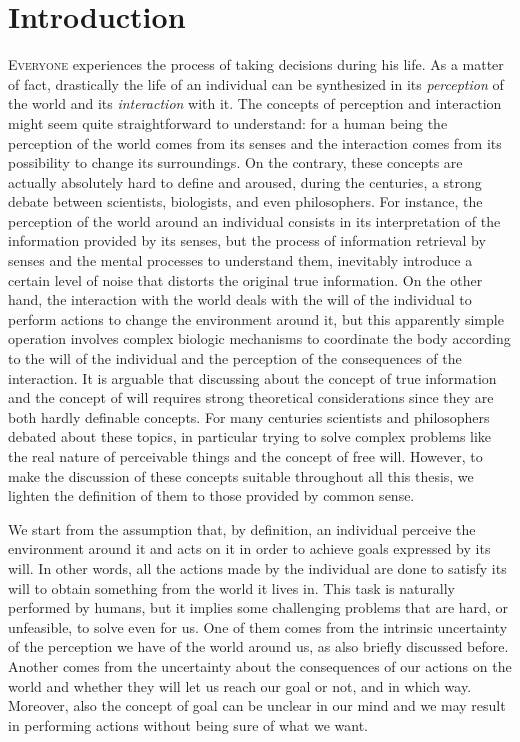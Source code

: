 \chapter{Introduction}
\lettrine{E}{veryone} experiences the process of taking decisions during his life. As a matter of fact, drastically the life of an individual can be synthesized in its \textit{perception} of the world and its \textit{interaction} with it. The concepts of perception and interaction might seem quite straightforward to understand: for a human being the perception of the world comes from its senses and the interaction comes from its possibility to change its surroundings. On the contrary, these concepts are actually absolutely hard to define and aroused, during the centuries, a strong debate between scientists, biologists, and even philosophers.
For instance, the perception of the world around an individual consists in its interpretation of the information provided by its senses, but the process of information retrieval by senses and the mental processes to understand them, inevitably introduce a certain level of noise that distorts the original true information. On the other hand, the interaction with the world deals with the will of the individual to perform actions to change the environment around it, but this apparently simple operation involves complex biologic mechanisms to coordinate the body according to the will of the individual and the perception of the consequences of the interaction.
It is arguable that discussing about the concept of true information and the concept of will requires strong theoretical considerations since they are both hardly definable concepts. For many centuries scientists and philosophers debated about these topics, in particular trying to solve complex problems like the real nature of perceivable things and the concept of free will. However, to make the discussion of these concepts suitable throughout all this thesis, we lighten the definition of them to those provided by common sense.

We start from the assumption that, by definition, an individual perceive the environment around it and acts on it in order to achieve goals expressed by its will. In other words, all the actions made by the individual are done to satisfy its will to obtain something from the world it lives in. This task is naturally performed by humans, but it implies some challenging problems that are hard, or unfeasible, to solve even for us. One of them comes from the intrinsic uncertainty of the perception we have of the world around us, as also briefly discussed before. Another comes from the uncertainty about the consequences of our actions on the world and whether they will let us reach our goal or not, and in which way. Moreover, also the concept of goal can be unclear in our mind and we may result in performing actions without being sure of what we want. 
